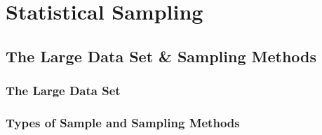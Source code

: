 \documentclass[../maths.tex]{subfiles}
\begin{document}
\chapter{Statistical Sampling}
\section{The Large Data Set \& Sampling Methods}
\subsection*{The Large Data Set}
\subsection*{Types of Sample and Sampling Methods}
\end{document}
